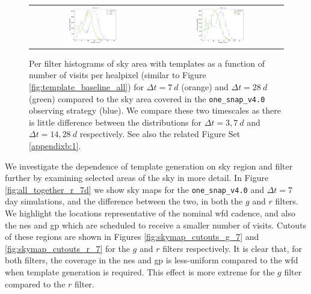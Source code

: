 \documentclass[preprintm,linenumbers]{aastex631}
\newcommand{\baseline}{\texttt{one\_snap\_v4.0}\xspace}
\begin{document}
\begin{figure}
\begin{tabular}{c c}
				\includegraphics[width=0.4\textwidth]{results/histograms/hist_first_year_one_snap_v4_0_10yrs_db_noDD_noTwi_CountMetric_doAllTemplateMetrics_reduceCount_z_noDD_noTwi.pdf} &
				\includegraphics[width=0.4\textwidth]{results/histograms/hist_first_year_one_snap_v4_0_10yrs_db_noDD_noTwi_CountMetric_doAllTemplateMetrics_reduceCount_y_noDD_noTwi.pdf} \\
			\end{tabular}
			\caption{
				Per filter histograms of sky area with templates as a function of number of visits per healpixel (similar to Figure \ref{fig:template_baseline_all}) for $\Delta t = 7\ \si{d}$ (orange) and $\Delta t = 28\ \si{d}$ (green) compared to the sky area covered in the \baseline observing strategy (blue).
    We compare these two timescales as there is little difference between the distributions for $\Delta t = 3, 7\ \si{d}$ and $\Delta t = 14, 28\ \si{d}$ respectively.
   See also the related Figure Set \ref{appendixb:1}.
			}
			\label{fig:template_baseline_histograms7_28d}
		\end{figure}


We investigate the dependence of template generation on sky region and filter further by examining selected areas of the sky in more detail.
In Figure \ref{fig:all_together_r_7d} we show sky maps for the \baseline and $\Delta t  =7$ day simulations, and the difference between the two, in both the $g$ and $r$ filters. 
We highlight the locations representative of the nominal \gls*{wfd} cadence, and also the \gls*{nes} and \gls*{gp} which are scheduled to receive a smaller number of visits.
Cutouts of these regions are shown in Figures \ref{fig:skymap_cutouts_g_7} and \ref{fig:skymap_cutouts_r_7} for the $g$ and $r$ filters respectively.
It is clear that, for both filters, the coverage in the \gls*{nes} and \gls*{gp} is less-uniform compared to the \gls*{wfd} when template generation is required.
This effect is more extreme for the $g$ filter compared to the $r$ filter.
\end{document}
